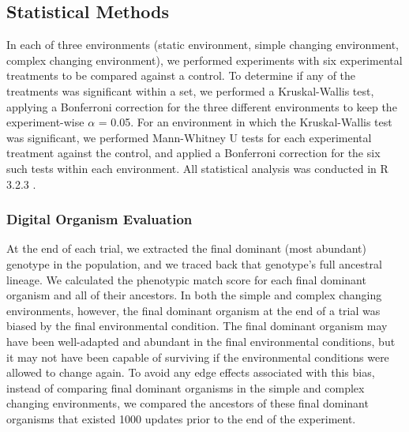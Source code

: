 \subsection{Statistical Methods}
In each of three environments (static environment, simple changing environment, complex changing environment),
we performed experiments with six experimental treatments to be compared against a control.
To determine if any of the treatments was significant within a set, we performed a Kruskal-Wallis test, applying a Bonferroni correction for the three different environments %
to keep the experiment-wise $\alpha$ = 0.05.  For an environment in which the Kruskal-Wallis test was significant, we performed Mann-Whitney U tests for each experimental treatment against the control, and applied a Bonferroni correction for the six such tests within each environment.  All statistical analysis was conducted in R 3.2.3 \citep{r_core_team_r:_2015}.

\subsubsection{Digital Organism Evaluation}
At the end of each trial, we extracted the final dominant (most abundant) genotype in the population, and we traced back that genotype's full ancestral lineage. We calculated the phenotypic match score for each final dominant organism and all of their ancestors. In both the simple and complex changing environments, however, the final dominant organism at the end of a trial was biased by the final environmental condition. The final dominant organism may have been well-adapted and abundant in the final environmental conditions, but it may not have been capable of surviving if the environmental conditions were allowed to change again. To avoid any edge effects associated with this bias, instead of comparing final dominant organisms in the simple and complex changing environments, we compared the ancestors of these final dominant organisms that existed 1000 updates prior to the end of the experiment.